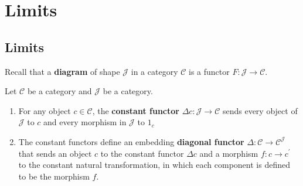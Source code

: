 \documentclass[12pt, oneside]{book}
\begin{document}
\chapter{Limits}

\section{Limits}
\begin{definition}
    Recall that a \textbf{diagram} of shape $\mathcal{J}$ in a category $\mathcal{C}$ is a functor $F: \mathcal{J}\to\mathcal{C}$.
\end{definition}


\begin{definition}
    Let $\mathcal{C}$ be a category and $\mathcal{J}$ be a category.
    \begin{enumerate}
        \item
              For any object $c\in\mathcal{C}$, the \textbf{constant functor} $\Delta c:\mathcal{J}\to\mathcal{C}$ sends every object of $\mathcal{J}$ to $c$ and every morphism in $\mathcal{J}$ to $1_c$
        \item
              The constant functors define an embedding \textbf{diagonal functor} $\Delta:\mathcal{C}\to\mathcal{C}^{\mathcal{J}}$ that sends an object $c$ to the constant functor $\Delta c$ and a morphism $f:c\to c^\prime$ to the constant natural transformation, in which each component is defined to be the morphism $f.$
    \end{enumerate}

\end{definition}
\end{document}

